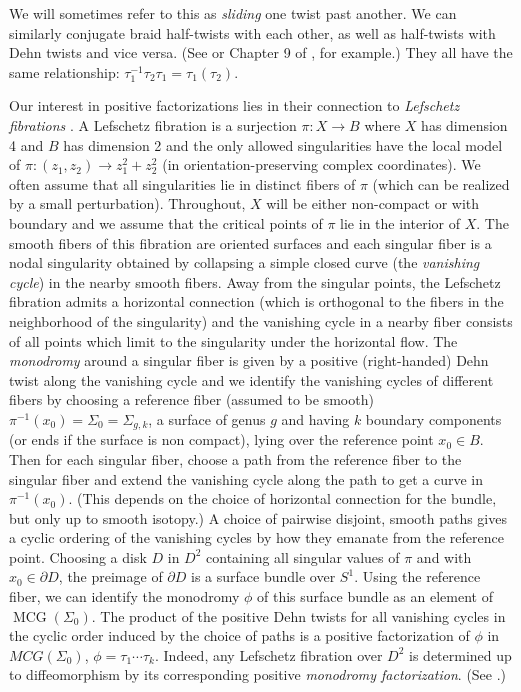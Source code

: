 \documentclass[11pt,letterpaper,reqno]{amsart}
\theoremstyle{remark}
\DeclareMathOperator{\MCG}{MCG}
\def \t {\tau}
\begin{document}
We will sometimes refer to this as \emph{sliding} one twist past another. We can similarly conjugate braid half-twists with each other, as well as half-twists with Dehn twists and vice versa. (See \cite{BirmanHilden} or Chapter 9 of \cite{FarbMargalit}, for example.) They all have the same relationship: $\t_1^{-1} \t_2 \t_1 = \t_1(\t_2)$.

Our interest in positive factorizations lies in their connection to \emph{Lefschetz fibrations} \cite{Donaldson, Gompf, LoiP}. A Lefschetz fibration is a surjection $\pi : X \rightarrow B$ where $X$ has dimension 4 and $B$ has dimension 2 and the only allowed singularities have the local model of $\pi:(z_1, z_2) \rightarrow z_1^2 + z_2^2$ (in orientation-preserving complex coordinates). We often assume that all singularities lie in distinct fibers of $\pi$ (which can be realized by a small perturbation). Throughout, $X$ will be either non-compact or with boundary and we assume that the critical points of $\pi$ lie in the interior of $X$. The smooth fibers of this fibration are oriented surfaces and each singular fiber is a nodal singularity obtained by collapsing a simple closed curve (the \emph{vanishing cycle}) in the nearby smooth fibers. Away from the singular points, the Lefschetz fibration admits a horizontal connection (which is orthogonal to the fibers in the neighborhood of the singularity) and the vanishing cycle in a nearby fiber consists of all points which limit to the singularity under the horizontal flow. The \emph{monodromy} around a singular fiber is given by a positive (right-handed) Dehn twist along the vanishing cycle and we identify the vanishing cycles of different fibers by choosing a reference fiber (assumed to be smooth) $\pi^{-1}(x_0) = \Sigma_0 = \Sigma_{g,k}$, a surface of genus $g$ and having $k$ boundary components (or ends if the surface is non compact), lying over the reference point $x_0 \in B$. Then for each singular fiber, choose a path from the reference fiber to the singular fiber and extend the vanishing cycle along the path to get a curve in $\pi^{-1}(x_0)$. (This depends on the choice of horizontal connection for the bundle, but only up to smooth isotopy.) A choice of pairwise disjoint, smooth paths gives a cyclic ordering of the vanishing cycles by how they emanate from the reference point. Choosing a disk $D$ in $D^2$ containing all singular values of $\pi$ and with $x_0 \in \partial D$, the preimage of $\partial D$ is a surface bundle over $S^1$. Using the reference fiber, we can identify the monodromy $\phi$ of this surface bundle as an element of $\MCG(\Sigma_0)$. The product of the positive Dehn twists for all vanishing cycles in the cyclic order induced by the choice of paths is a positive factorization of $\phi$ in $MCG(\Sigma_0)$, $\phi = \t_1 \cdots \t_k$. Indeed, any Lefschetz fibration over $D^2$ is determined up to diffeomorphism by its corresponding positive \emph{monodromy factorization}. (See \cite{GS}.)
\end{document}
